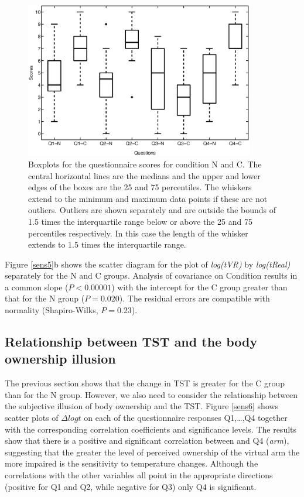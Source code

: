 \documentclass[
		twoside,openright,titlepage,numbers=noenddot,manychapters,
		headinclude,%
                footinclude=false,cleardoublepage=empty,
                BCOR=5mm,
		fontsize=11pt, %
                 enabledeprecatedfontcommands]{scrreprt}
\begin{document}
\begin{figure}[]
\begin{center}
\includegraphics[width=10cm]{figures/sens/Figure4.eps}
\caption{Boxplots for the questionnaire scores for condition N and C. The central horizontal lines are the medians and the upper and lower edges of the boxes are the 25 and 75 percentiles. The whiskers extend to the minimum and maximum data points if these are not outliers. Outliers are shown separately and are outside the bounds of 1.5 times the interquartile range below or above the 25 and 75 percentiles respectively. In this case the length of the whisker extends to 1.5 times the interquartile range. }
\label{sens4}
\end{center}
\end{figure} 


Figure \ref{sens5}b shows the scatter diagram for the plot of \emph{log(tVR)} by \emph{log(tReal)} separately for the N and C groups. Analysis of covariance on Condition results in a common slope ($P < 0.00001$) with the intercept for the C group greater than that for the N group ($P = 0.020$). The residual errors are compatible with normality (Shapiro-Wilks, $P = 0.23$).



\subsection{Relationship between TST and the body ownership illusion}
 
The previous section shows that the change in TST is greater for the C group than for the N group. However, we also need to consider the relationship between the subjective illusion of body ownership and the TST. Figure \ref{sens6} shows scatter plots of  $\Delta log t$
 on each of the questionnaire responses Q1,…,Q4 together with the corresponding correlation coefficients and significance levels. The results show that there is a positive and significant correlation between  and Q4 (\emph{arm}), suggesting that the greater the level of perceived ownership of the virtual arm the more impaired is the sensitivity to temperature changes. Although the correlations with the other variables all point in the appropriate directions (positive for Q1 and Q2, while negative for Q3) only Q4 is significant. 
\end{document}
